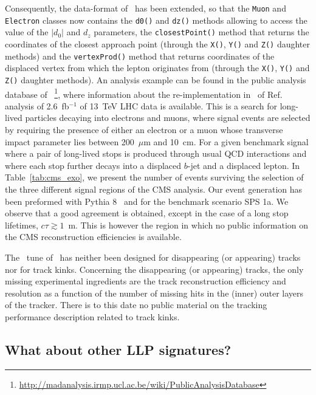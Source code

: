 Consequently, the data-format of \MA\ has been extended, so that the \verb+Muon+ and
\verb+Electron+ classes now contains the \verb+d0()+ and \verb+dz()+ methods allowing to
access the value of the $|d_0|$ and $d_z$ parameters, the \verb+closestPoint()+
method that returns the coordinates of the closest approach point (through the
\verb+X()+, \verb+Y()+ and \verb+Z()+ daughter methods) and the
\verb+vertexProd()+ method that returns coordinates of the displaced vertex from
which the lepton originates from (through the \verb+X()+, \verb+Y()+ and
\verb+Z()+ daughter methods). An analysis example \cite{MA5:longlivedleptons} can be found in the public analysis database of \MA~\footnote{ \url{http://madanalysis.irmp.ucl.ac.be/wiki/PublicAnalysisDatabase}},
where information about the re-implementation in \MA\ of Ref.~\cite{CMS-PAS-EXO-16-022}  
analysis of 2.6~fb$^{-1}$ of 13~TeV LHC data is available. This is a search for long-lived particles decaying into electrons and muons, where signal
events are selected by requiring the presence of either an electron or a muon
whose transverse impact parameter lies between 200~$\mu$m and 10~cm. For a given
benchmark signal where a pair of long-lived stops is produced through usual QCD
interactions and where each stop further decays into a displaced $b$-jet and a
displaced lepton. In Table~\ref{tab:cms_exo}, we present the number of events
surviving the selection of the three different signal regions of the CMS analysis.
Our event generation has been preformed with {\sc Pythia} 8~\cite{Sjostrand:2007gs}
and for the benchmark
scenario SPS 1a.
We observe that a good agreement is obtained, except in the case of a long stop
lifetimes, $c\tau \gtrsim 1$~m. 
This is however the region in which no public information on
the CMS reconstruction efficiencies is available.

The \MA\ tune of \DEL\ has neither been designed for disappearing
(or appearing) tracks nor for track kinks. Concerning the disappearing (or appearing)
tracks, the only missing experimental ingredients are the track reconstruction efficiency
and resolution as a function of the number of missing hits in the (inner) outer
layers of the tracker. There is to this date no public material on the tracking
performance description related to track kinks.

\subsection{What about other LLP signatures?}

